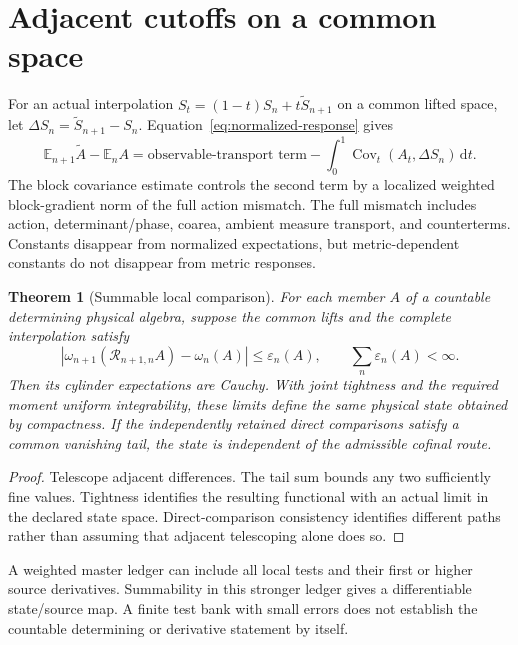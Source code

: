 \documentclass[11pt,a4paper,oneside]{book}
\theoremstyle{plain}
\newtheorem{theorem}{Theorem}[chapter]
\theoremstyle{definition}
\theoremstyle{remark}
\newcommand{\E}{\mathbb E}
\newcommand{\dd}{\mathrm d}
\newcommand{\Cov}{\operatorname{Cov}}
\begin{document}
\section{Adjacent cutoffs on a common space}
For an actual interpolation $S_t=(1-t)S_n+t\widetilde S_{n+1}$ on a common lifted space, let $\Delta S_n=\widetilde S_{n+1}-S_n$. Equation~\eqref{eq:normalized-response} gives
\begin{equation}
 \E_{n+1}\widetilde A-\E_nA
 =\text{observable-transport term}
 -\int_0^1\Cov_t(A_t,\Delta S_n)\,\dd t.
 \label{eq:cutoff-comparison}
\end{equation}
The block covariance estimate controls the second term by a localized weighted block-gradient norm of the full action mismatch. The full mismatch includes action, determinant/phase, coarea, ambient measure transport, and counterterms. Constants disappear from normalized expectations, but metric-dependent constants do not disappear from metric responses. \cite{R8,R16}

\begin{theorem}[Summable local comparison]
\label{thm:summable}
For each member $A$ of a countable determining physical algebra, suppose the common lifts and the complete interpolation satisfy
\begin{equation}
 |\omega_{n+1}(\mathcal R_{n+1,n}A)-\omega_n(A)|
 \le\varepsilon_n(A),\qquad
 \sum_n\varepsilon_n(A)<\infty.
 \label{eq:summable}
\end{equation}
Then its cylinder expectations are Cauchy. With joint tightness and the required moment uniform integrability, these limits define the same physical state obtained by compactness. If the independently retained direct comparisons satisfy a common vanishing tail, the state is independent of the admissible cofinal route.
\end{theorem}
\begin{proof}
Telescope adjacent differences. The tail sum bounds any two sufficiently fine values. Tightness identifies the resulting functional with an actual limit in the declared state space. Direct-comparison consistency identifies different paths rather than assuming that adjacent telescoping alone does so.
\end{proof}
\cite{R8,R12,R16,R18}

A weighted master ledger can include all local tests and their first or higher source derivatives. Summability in this stronger ledger gives a differentiable state/source map. A finite test bank with small errors does not establish the countable determining or derivative statement by itself.
\end{document}
